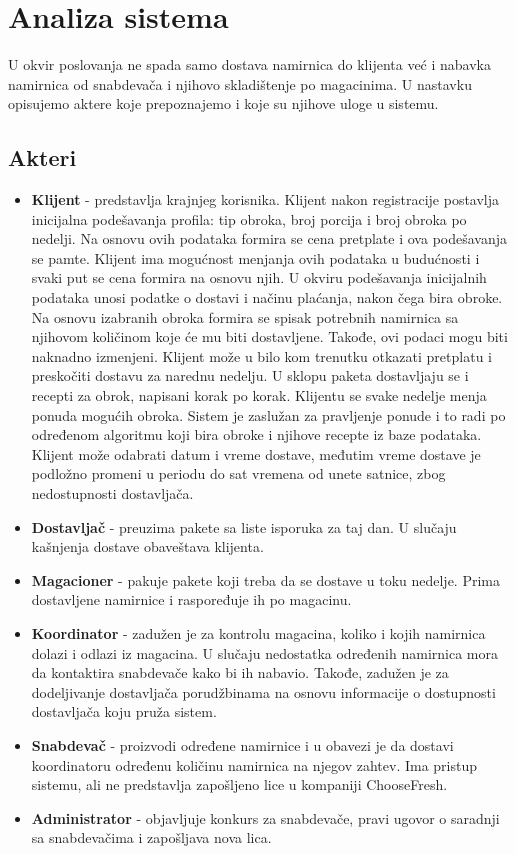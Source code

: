 
\section{Analiza sistema}

	U okvir poslovanja ne spada samo dostava namirnica do klijenta već i nabavka namirnica od snabdevača i njihovo skladištenje po magacinima. U nastavku opisujemo aktere koje prepoznajemo i koje su njihove uloge u sistemu.

\subsection{Akteri}
	\begin{itemize}
		\item{\textbf{Klijent}} - predstavlja krajnjeg korisnika. Klijent nakon registracije postavlja inicijalna podešavanja profila: tip obroka, broj porcija i broj obroka po nedelji. Na osnovu ovih podataka formira se cena pretplate i ova podešavanja se pamte. Klijent ima mogućnost menjanja ovih podataka u budućnosti i svaki put se cena formira na osnovu njih. U okviru podešavanja inicijalnih podataka unosi podatke o dostavi i načinu plaćanja, nakon čega bira obroke. Na osnovu izabranih obroka formira se spisak potrebnih namirnica sa njihovom količinom koje će mu biti dostavljene. Takođe, ovi podaci mogu biti naknadno izmenjeni. Klijent može u bilo kom trenutku otkazati pretplatu i preskočiti dostavu za narednu nedelju. U sklopu paketa dostavljaju se i recepti za obrok, napisani korak po korak. Klijentu se svake nedelje menja ponuda mogućih obroka. Sistem je zaslužan za pravljenje ponude i to radi po određenom algoritmu koji bira obroke i njihove recepte iz baze podataka. Klijent može odabrati datum i vreme dostave, međutim vreme dostave je podložno promeni u periodu do sat vremena od unete satnice, zbog nedostupnosti dostavljača.
		\item{\textbf{Dostavljač}} - preuzima pakete sa liste isporuka za taj dan. U slučaju kašnjenja dostave obaveštava klijenta.
		\item{\textbf{Magacioner}} - pakuje pakete koji treba da se dostave u toku nedelje. Prima dostavljene namirnice i raspoređuje ih po magacinu.
		\item{\textbf{Koordinator}} - zadužen je za kontrolu magacina, koliko i kojih namirnica dolazi i odlazi iz magacina. U slučaju nedostatka određenih namirnica mora da kontaktira snabdevače kako bi ih nabavio. Takođe, zadužen je za dodeljivanje dostavljača porudžbinama na osnovu informacije o dostupnosti dostavljača koju pruža sistem.
		\item{\textbf{Snabdevač}} - proizvodi određene namirnice i u obavezi je da dostavi koordinatoru određenu količinu namirnica na njegov zahtev. Ima pristup sistemu, ali ne predstavlja zapošljeno lice u kompaniji ChooseFresh.
		\item{\textbf{Administrator}} - objavljuje konkurs za snabdevače, pravi ugovor o saradnji sa snabdevačima i zapošljava nova lica. 
		

\end{itemize}
